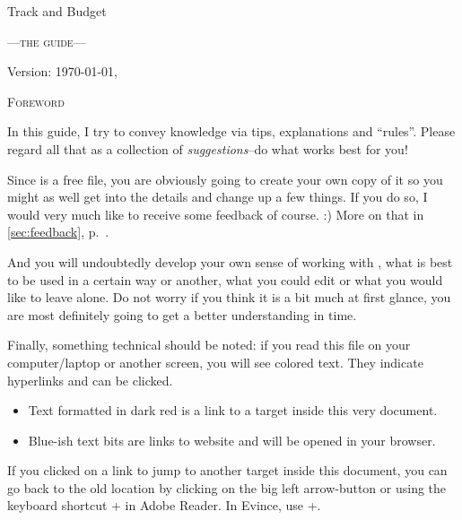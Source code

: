 
\begin{center}\LARGE
Track and Budget
\end{center}
\begin{center}\scshape\large\sffamily
	---the guide---
\end{center}

\vfill
\begin{center}
Version: \today, \thistime
\end{center}

\clearpage
\begin{center}\large\scshape
	Foreword
\end{center}
In this guide, I try to convey knowledge via tips, explanations and ``rules''.
Please regard all that as a collection of \emph{suggestions}--do what works best for you!

Since \tfn is a free file, you are obviously going to create your own copy of it so you might as well get into the details and change up a few things.
If you do so, I would very much like to receive some feedback of course. :)
More on that in \autoref{sec:feedback}, p.~\pageref{sec:feedback}.

And you will undoubtedly develop your own sense of working with \tfn, what is best to be used in a certain way or another, what you could edit or what you would like to leave alone.
Do not worry if you think it is a bit much at first glance, you are most definitely going to get a better understanding in time.

Finally, something technical should be noted: if you read this file on your computer/laptop or another screen, you will see colored text.
They indicate hyperlinks and can be clicked.
\begin{itemize}
	\item Text formatted in dark red is a link to a target inside this very document.
	\item Blue-ish text bits are links to website and will be opened in your browser.
\end{itemize}
If you clicked on a link to jump to another target inside this document, you can go back to the old location by clicking on the big left arrow-button or using the keyboard shortcut +\keystroke{\( \leftarrow \)}  in Adobe Reader.
In Evince, use +.
